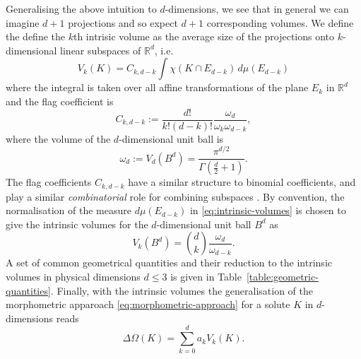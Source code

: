 Generalising the above intuition to $d$-dimensions, we see that in general we can imagine $d+1$ projections and so expect $d+1$ corresponding volumes.
We define the define the $k$th intrisic volume as the average size of the projections onto $k$-dimensional linear subspaces of $\mathbb{R}^d$, i.e.\
\begin{equation}\label{eq:intrinsic-volumes}
  V_k(K)
  =
  C_{k,d-k}
  \int \chi(K \cap E_{d-k}) \, d\mu(E_{d-k})
\end{equation}
where the integral is taken over all affine transformations of the plane $E_k$ in $\mathbb{R}^d$ and the flag coefficient is
\begin{equation}\label{eq:flag-coefficients}
  C_{k,d-k}
  :=
  \frac{d!}{k! (d-k)!} \frac{\omega_d}{\omega_k \omega_{d-k}},
\end{equation}
where the volume of the $d$-dimensional unit ball is
\begin{equation}
  \omega_d := V_d(B^d) = \frac{\pi^{d/2}}{\Gamma(\frac{d}{2} + 1)}.
\end{equation}
The flag coefficients $C_{k,d-k}$ have a similar structure to binomial coefficients, and play a similar \emph{combinatorial} role for combining subspaces \cite{Klain1997}.
By convention, the normalisation of the measure $d\mu(E_{d-k})$ in \eqref{eq:intrinsic-volumes} is chosen to give the intrinsic volumes for the $d$-dimensional unit ball $B^d$ as
\begin{equation}\label{eq:intrinsic-volume-ball}
  V_k (B^d)
  =
  {d \choose k} \frac{\omega_d}{\omega_{d-k}}.
\end{equation}
A set of common geometrical quantities and their reduction to the intrinsic volumes in physical dimensions $d \le 3$ is given in Table~\ref{table:geometric-quantities}.
Finally, with the intrinsic volumes the generalisation of the morphometric apparoach \eqref{eq:morphometric-approach} for a solute $K$ in $d$-dimensions reads
\begin{equation}\label{eq:morphometric-approach-d}
  \Delta \Omega(K)
  =
  \sum_{k=0}^d a_k V_k(K).
\end{equation}

